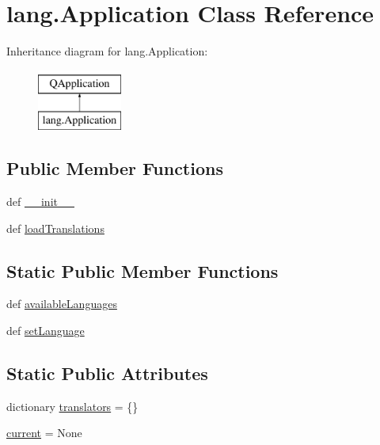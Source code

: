 \hypertarget{classlang_1_1Application}{}\section{lang.\+Application Class Reference}
\label{classlang_1_1Application}
Inheritance diagram for lang.\+Application\+:\begin{figure}[H]
\begin{center}
\leavevmode
\includegraphics[height=2.000000cm]{classlang_1_1Application}
\end{center}
\end{figure}
\subsection*{Public Member Functions}
\begin{DoxyCompactItemize}
\item 
def \hyperlink{classlang_1_1Application_a911ac93f72c53f76bac62d1006447ccf}{\+\_\+\+\_\+init\+\_\+\+\_\+}
\item 
def \hyperlink{classlang_1_1Application_ab09199d42e866c5eefd1af5e01d34f13}{load\+Translations}
\end{DoxyCompactItemize}
\subsection*{Static Public Member Functions}
\begin{DoxyCompactItemize}
\item 
def \hyperlink{classlang_1_1Application_ac157ca346181ee9ff1b6bafdeeff9812}{available\+Languages}
\item 
def \hyperlink{classlang_1_1Application_ab1041e58d4bcec85a9adfcd3b22e3648}{set\+Language}
\end{DoxyCompactItemize}
\subsection*{Static Public Attributes}
\begin{DoxyCompactItemize}
\item 
dictionary \hyperlink{classlang_1_1Application_a0671a8dcda5b4637b176c82701011242}{translators} = \{\}
\item 
\hyperlink{classlang_1_1Application_a0351f2d21182b48ce883a1cd14dd0e67}{current} = None
\end{DoxyCompactItemize}


